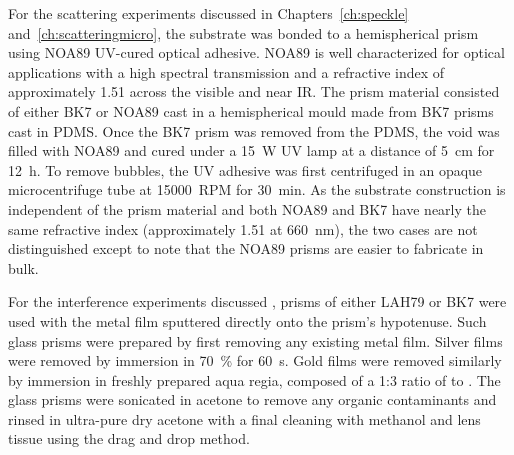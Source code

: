 For the scattering experiments discussed in Chapters~\ref{ch:speckle}
and~\ref{ch:scatteringmicro}, the substrate was bonded to a hemispherical prism
using NOA89 UV-cured optical adhesive.  NOA89 is well characterized for optical
applications with a high spectral transmission and a refractive index of
approximately 1.51 across the visible and near IR\@.  The prism material
consisted of either BK7 or NOA89 cast in a hemispherical mould made from BK7
prisms cast in PDMS\@.  Once the BK7 prism was removed from the PDMS, the void
was filled with NOA89 and cured under a \SI{15}{\watt} UV lamp at a distance of
\SI{5}{\centi\meter} for \SI{12}{\hour}.  To remove bubbles, the UV adhesive
was first centrifuged in an opaque microcentrifuge tube at \SI{15000}{RPM} for
\SI{30}{\minute}.  As the substrate construction is independent of the prism
material and both NOA89 and BK7 have nearly the same refractive index
(approximately 1.51 at \SI{660}{\nano\meter}), the two cases are not
distinguished except to note that the NOA89 prisms are easier to fabricate in
bulk.

For the interference experiments discussed , prisms of
either LAH79 or BK7 were used with the metal film sputtered directly onto the
prism's hypotenuse.  Such glass prisms were prepared by first removing any
existing metal film.  Silver films were removed by immersion in
\SI{70}{\percent}  for \SI{60}{\second}.  Gold films were removed
similarly by immersion in freshly prepared aqua regia, composed of a 1:3 ratio
of  to .  The glass prisms were sonicated in acetone to remove
any organic contaminants and rinsed in ultra-pure dry acetone with a final cleaning with methanol and lens tissue using the drag and drop method.
